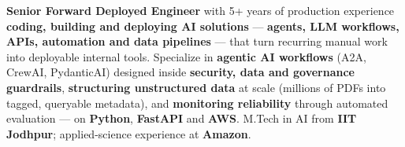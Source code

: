 \documentclass[letter,10pt]{article}
\begin{document}

\textbf{Senior Forward Deployed Engineer} with 5+ years of production experience \textbf{coding, building and deploying AI solutions} — \textbf{agents, LLM workflows, APIs, automation and data pipelines} — that turn recurring manual work into deployable internal tools.
Specialize in \textbf{agentic AI workflows} (A2A, CrewAI, PydanticAI) designed inside \textbf{security, data and governance guardrails}, \textbf{structuring unstructured data} at scale (millions of PDFs into tagged, queryable metadata), and \textbf{monitoring reliability} through automated evaluation — on \textbf{Python}, \textbf{FastAPI} and \textbf{AWS}.
M.Tech in AI from \textbf{IIT Jodhpur}; applied-science experience at \textbf{Amazon}.
\end{document}
